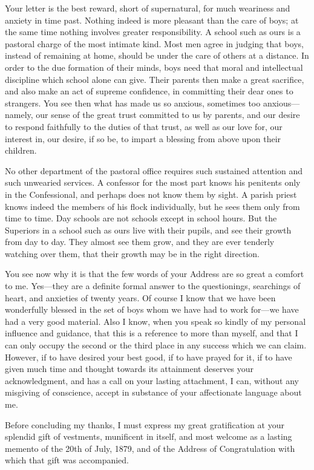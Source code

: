 Your letter is the best reward, short of supernatural, for much
weariness and anxiety in time past. Nothing indeed is more pleasant
than the care of boys; at the same time nothing involves greater
responsibility. A school such as ours is a pastoral charge of the most
intimate kind. Most men agree in judging that boys, instead of
remaining at home, should be under the care of others at a distance.
In order to the due formation of their minds, boys need that moral and
intellectual discipline which school alone can give. Their parents
then make a great sacrifice, and also make an act of supreme
confidence, in committing their dear ones to strangers. You see
then what has made us so anxious, sometimes too anxious—namely, our
sense of the great trust committed to us by parents, and our desire to
respond faithfully to the duties of that trust, as well as our love
for, our interest in, our desire, if so be, to impart a blessing from
above upon their children.

No other department of the pastoral office requires such sustained
attention and such unwearied services. A confessor for the most part
knows his penitents only in the Confessional, and perhaps does not
know them by sight. A parish priest knows indeed the members of his
flock individually, but he sees them only from time to time. Day
schools are not schools except in school hours. But the Superiors in a
school such as ours live with their pupils, and see their growth from
day to day. They almost see them grow, and they are ever tenderly
watching over them, that their growth may be in the right direction.

You see now why it is that the few words of your Address are so
great a comfort to me. Yes—they are a definite formal answer to the
questionings, searchings of heart, and anxieties of twenty
years. Of course I know that we have been wonderfully blessed in the
set of boys whom we have had to work for—we have had a very good
material. Also I know, when you speak so kindly of my personal
influence and guidance, that this is a reference to more than myself,
and that I can only occupy the second or the third place in any
success which we can claim. However, if to have desired your best
good, if to have prayed for it, if to have given much time and thought
towards its attainment deserves your acknowledgment, and has a call on
your lasting attachment, I can, without any misgiving of conscience,
accept in substance of your affectionate language about me.

Before concluding my thanks, I must express my great gratification
at your splendid gift of vestments, munificent in itself, and most
welcome as a lasting memento of the 20th of July, 1879, and of the
Address of Congratulation with which that gift was accompanied.

